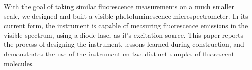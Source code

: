 With the goal of taking similar fluorescence measurements on a much smaller scale, we designed and built a visible photoluminescence microspectrometer. In its current form, the instrument is capable of measuring fluorescence emissions in the visible spectrum, using a diode laser as it's excitation source. This paper reports the process of designing the instrument, lessons learned during construction, and demonstrates the use of the instrument on two distinct samples of fluorescent molecules.
